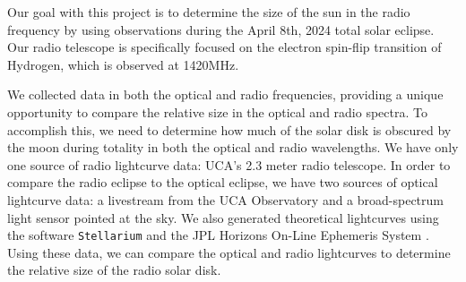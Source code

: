 Our goal with this project is to determine the size of the sun in the radio frequency by using observations during the April 8th, 2024 total solar eclipse.
Our radio telescope is specifically focused on the electron spin-flip transition of Hydrogen, which is observed at 1420MHz.

We collected data in both the optical and radio frequencies, providing a unique opportunity to compare the relative size in the optical and radio spectra.
To accomplish this, we need to determine how much of the solar disk is obscured by the moon during totality in both the optical and radio wavelengths.
We have only one source of radio lightcurve data: UCA's 2.3 meter radio telescope.
In order to compare the radio eclipse to the optical eclipse, we have two sources of optical lightcurve data: a livestream from the UCA Observatory and a broad-spectrum light sensor pointed at the sky.
We also generated theoretical lightcurves using the software \texttt{Stellarium}\cite{zotti_simulated_2020} and the JPL Horizons On-Line Ephemeris System \cite{nasa_jpl_solar_system_dynamics_group_jpl_nodate}.
Using these data, we can compare the optical and radio lightcurves to determine the relative size of the radio solar disk.
